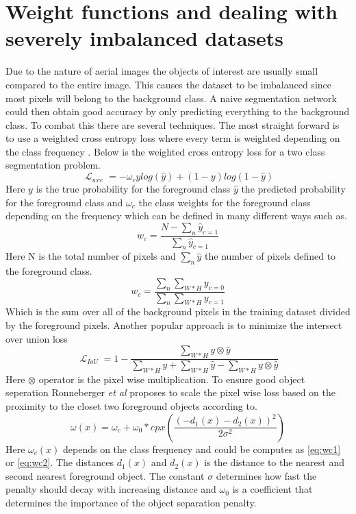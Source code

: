 \documentclass{kththesis}
\DeclareMathOperator{\Lagr}{\mathcal{L}}
\begin{document}
\section{Weight functions and dealing with severely imbalanced datasets}
Due to the nature of aerial images the objects of interest are usually small compared to the entire image. This causes the dataset to be imbalanced since most pixels will belong to the background class. A naive segmentation network could then obtain good accuracy by only predicting everything to the background class. To combat this there are several techniques. The most straight forward is to use a weighted cross entropy loss where every term is weighted depending on the class frequency \parencite{sudre_generalised_2017}. Below is the weighted cross entropy loss for a two class segmentation problem.
\begin{equation}
\Lagr_{wce}=-\omega_cylog(\hat{y}) + (1-y)log(1-\hat{y})
\end{equation}
Here $y$ is the true probability for the foreground class  $\hat{y}$ the predicted probability for the foreground class and $\omega_c$ the class weights for the foreground class depending on the frequency which can be defined in many different ways such as. 
\begin{equation}\label{eq:wc1}
w_c=\frac{N - \sum_{n}{} \hat{y}_{c=1}}{\sum_{n} \hat{y}_{c=1}}
\end{equation}
Here N is the total number of pixels and $\sum_{n}{} \hat{y}$ the number of pixels defined to the foreground class. 
\begin{equation}\label{eq:wc2}
w_c=\frac{\sum_{n}{} \sum_{W*H} y_{c=0}}{\sum_{n} \sum_{W*H} y_{c=1}}
\end{equation}
Which is the sum over all of the background pixels in the training dataset divided by the foreground pixels.
Another popular approach is to minimize the intersect over union loss \parencite{yu_unitbox:_2016, rahman_optimizing_2016}
\begin{equation}
\Lagr_{IoU}= 1 - \frac{ \sum_{W*H} y \otimes \hat{y} }{ \sum_{W*H} y + \sum_{W*H} \hat{y} - \sum_{W*H} y \otimes \hat{y}}
\end{equation}
Here $\otimes$ operator is the pixel wise multiplication. To ensure good object seperation Ronneberger \textit{et al} \parencite{ronneberger_u-net:_2015} proposes to scale the pixel wise loss based on the proximity to the closet two foreground objects according to.
\begin{equation}\label{eq:weight}
\omega(x)=\omega_c+\omega_0*epx(\frac{(-d_1(x)-d_2(x))^{2}}{2\sigma^2})
\end{equation}
Here $\omega_c(x)$ depends on the class frequency and could be computes as \ref{eq:wc1} or \ref{eq:wc2}. The distances $d_1(x)$ and $d_2(x)$ is the distance to the nearest and second nearest foreground object. The constant $\sigma$ determines how fast the penalty should decay with increasing distance and $\omega_0$ is a coefficient that determines the importance of the object separation penalty.
\end{document}
